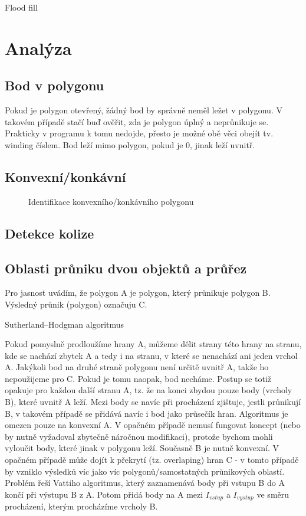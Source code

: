 \documentclass[a4paper,12pt]{book}
\begin{document}
Flood fill




\chapter{Analýza}
\section{Bod v polygonu}
Pokud je polygon otevřený, žádný bod by správně neměl ležet v polygonu. V takovém případě stačí buď ověřit, zda je polygon úplný a neprůnikuje se. Prakticky v programu k tomu nedojde, přesto je možné obě věci obejít tv. winding číslem. Bod leží mimo polygon, pokud je 0, jinak leží uvnitř.


\section{Konvexní/konkávní}
 \begin{figure}[H]
  \centering
  
  \caption{Identifikace konvexního/konkávního polygonu}
\end{figure}
\section{Detekce kolize}
\section{Oblasti průniku dvou objektů a průřez}

Pro jasnost uvádím, že polygon A je polygon, který průnikuje polygon B. Výsledný průnik (polygon) označuju C.

Sutherland–Hodgman algoritmus


Pokud pomyslně prodloužíme hrany A, můžeme dělit strany této hrany na stranu, kde se nachází zbytek A a tedy i na stranu, v které se nenachází ani jeden vrchol A. Jakýkoli bod na  druhé straně polygonu není určitě uvnitř A, takže ho nepoužijeme pro C. Pokud je tomu naopak, bod necháme. Postup se totiž opakuje pro každou další stranu A, tz. že na konci zbydou pouze body (vrcholy B), které uvnitř A leží. Mezi body se navíc při procházení zjištuje, jestli průnikují B, v takovém případě se přidává navíc i bod jako průsečík hran. Algoritmus je omezen pouze na konvexní A. V opačném případě nemusí fungovat koncept (nebo by nutně vyžadoval zbytečně náročnou modifikaci), protože bychom mohli vyloučit body, které jinak v polygonu leží. Současně B je nutně konvexní. V opačném případě může dojít k překrytí (tz. overlaping) hran C - v tomto případě by vzniklo výsledků víc jako víc polygonů/samostatných průnikových oblastí. Problém řeší Vattiho algoritmus, který zaznamenává body při vstupu B do A končí při výstupu B z A. Potom přidá body na A mezi $I_{vstup}$ a $I_{vystup}$ ve směru procházení, kterým procházíme vrcholy B.
\end{document}
